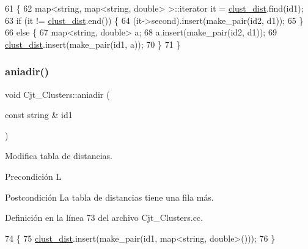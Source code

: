 \begin{DoxyCode}
61 \{
62     map<string, map<string, double> >::iterator it = \hyperlink{class_cjt___clusters_a2e0931084578a4abb26d17bf289628d2}{clust\_dist}.find(id1);
63     \textcolor{keywordflow}{if} (it != \hyperlink{class_cjt___clusters_a2e0931084578a4abb26d17bf289628d2}{clust\_dist}.end()) \{
64         (it->second).insert(make\_pair(id2, d1));
65     \}
66     \textcolor{keywordflow}{else} \{
67         map<string, double> a;
68         a.insert(make\_pair(id2, d1));
69         \hyperlink{class_cjt___clusters_a2e0931084578a4abb26d17bf289628d2}{clust\_dist}.insert(make\_pair(id1, a));
70     \}
71 \}
\end{DoxyCode}
\mbox{\label{class_cjt___clusters_a8f2627ad9c0af787c781ec38be8a8171}} 
\subsubsection{\texorpdfstring{aniadir()}{aniadir()}}
{\footnotesize\ttfamily void Cjt\+\_\+\+Clusters\+::aniadir (\begin{DoxyParamCaption}\item[{const string \&}]{id1 }\end{DoxyParamCaption})}



Modifica tabla de distancias. 

\begin{DoxyPrecond}{Precondición}
L 
\end{DoxyPrecond}
\begin{DoxyPostcond}{Postcondición}
La tabla de distancias tiene una fila más. 
\end{DoxyPostcond}


Definición en la línea 73 del archivo Cjt\+\_\+\+Clusters.\+cc.


\begin{DoxyCode}
74 \{
75     \hyperlink{class_cjt___clusters_a2e0931084578a4abb26d17bf289628d2}{clust\_dist}.insert(make\_pair(id1, map<string, double>()));
76 \}
\end{DoxyCode}
\mbox{\label{class_cjt___clusters_a74ce6f42cecc4c26fea5a6ea21fa4123}} 

